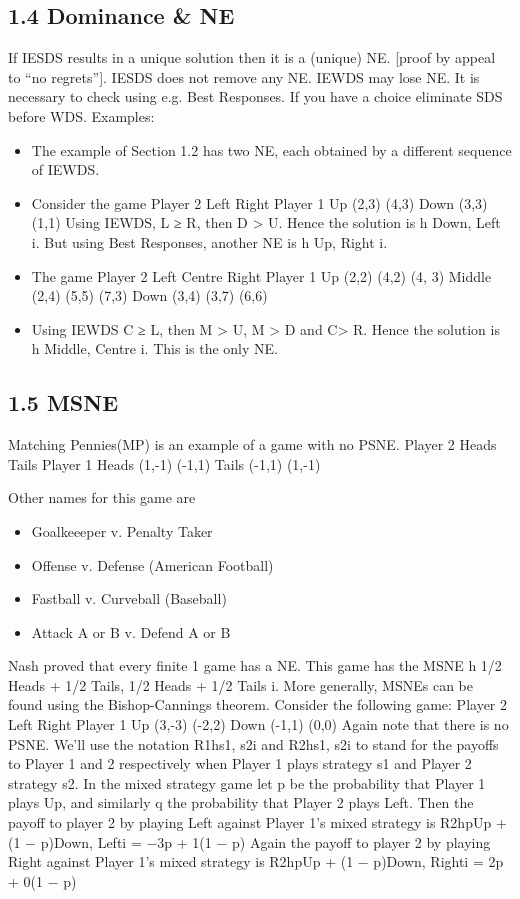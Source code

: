\subsection{1.4 Dominance \& NE}
If IESDS results in a unique solution then it is a (unique) NE. [proof by appeal to “no
regrets”]. IESDS does not remove any NE.
IEWDS may lose NE. It is necessary to check using e.g. Best Responses. If you have a
choice eliminate SDS before WDS. Examples:
\begin{itemize}
\item The example of Section 1.2 has two NE, each obtained by a different sequence of
IEWDS.
\item  Consider the game
Player 2
Left Right
Player 1 Up (2,3) (4,3)
Down (3,3) (1,1)
Using IEWDS, L ≥ R, then D > U. Hence the solution is h Down, Left i. But using
Best Responses, another NE is h Up, Right i.
\item  The game
Player 2
Left Centre Right
Player 1
Up (2,2) (4,2) (4, 3)
Middle (2,4) (5,5) (7,3)
Down (3,4) (3,7) (6,6)
\item  Using IEWDS C ≥ L, then M > U, M > D and C> R. Hence the solution is
h Middle, Centre i. This is the only NE.
\end{itemize}
\subsection{1.5 MSNE}
Matching Pennies(MP) is an example of a game with no PSNE.
Player 2
Heads Tails
Player 1 Heads (1,-1) (-1,1)
Tails (-1,1) (1,-1)

Other names for this game are
\begin{itemize}
\item Goalkeeeper v. Penalty Taker
\item Offense v. Defense (American Football)
\item Fastball v. Curveball (Baseball)
\item Attack A or B v. Defend A or B
\end{itemize}
Nash proved that every finite 1 game has a NE.
This game has the MSNE h 1/2 Heads + 1/2 Tails, 1/2 Heads + 1/2 Tails i.
More generally, MSNEs can be found using the Bishop-Cannings theorem. Consider the
following game:
Player 2
Left Right
Player 1 Up (3,-3) (-2,2)
Down (-1,1) (0,0)
Again note that there is no PSNE. We’ll use the notation R1hs1, s2i and R2hs1, s2i to
stand for the payoffs to Player 1 and 2 respectively when Player 1 plays strategy s1 and
Player 2 strategy s2.
In the mixed strategy game let p be the probability that Player 1 plays Up, and similarly
q the probability that Player 2 plays Left. Then the payoff to player 2 by playing Left
against Player 1’s mixed strategy is
R2hpUp + (1 − p)Down, Lefti = −3p + 1(1 − p)
Again the payoff to player 2 by playing Right against Player 1’s mixed strategy is
R2hpUp + (1 − p)Down, Righti = 2p + 0(1 − p)

